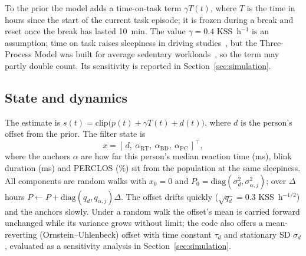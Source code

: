To the prior the model adds a time-on-task term $\gamma T(t)$, where $T$ is the time in hours since the start of the current task episode; it is frozen during a break and reset once the break has lasted 10~min. The value $\gamma = 0.4$ KSS~h$^{-1}$ is an assumption; time on task raises sleepiness in driving studies~\cite{akerstedt2010reaction}, but the Three-Process Model was built for average sedentary workloads~\cite{akerstedt2004predictions}, so the term may partly double count. Its sensitivity is reported in Section~\ref{sec:simulation}.

\subsection{State and dynamics}
The estimate is $s(t) = \mathrm{clip}\big(p(t) + \gamma T(t) + d(t)\big)$, where $d$ is the person's offset from the prior. The filter state is
\begin{equation}
  x = [\,d,\ \alpha_{\mathrm{RT}},\ \alpha_{\mathrm{BD}},\ \alpha_{\mathrm{PC}}\,]^\top,
\end{equation}
where the anchors $\alpha$ are how far this person's median reaction time (ms), blink duration (ms) and PERCLOS (\%) sit from the population at the same sleepiness. All components are random walks with $x_0 = 0$ and $P_0 = \mathrm{diag}(\sigma_d^2, \sigma_{\alpha,j}^2)$; over $\Delta$ hours $P \leftarrow P + \mathrm{diag}(q_d, q_{\alpha,j})\Delta$. The offset drifts quickly ($\sqrt{q_d} = 0.3$ KSS~h$^{-1/2}$) and the anchors slowly. Under a random walk the offset's mean is carried forward unchanged while its variance grows without limit; the code also offers a mean-reverting (Ornstein--Uhlenbeck) offset with time constant $\tau_d$ and stationary SD $\sigma_d$, evaluated as a sensitivity analysis in Section~\ref{sec:simulation}.

